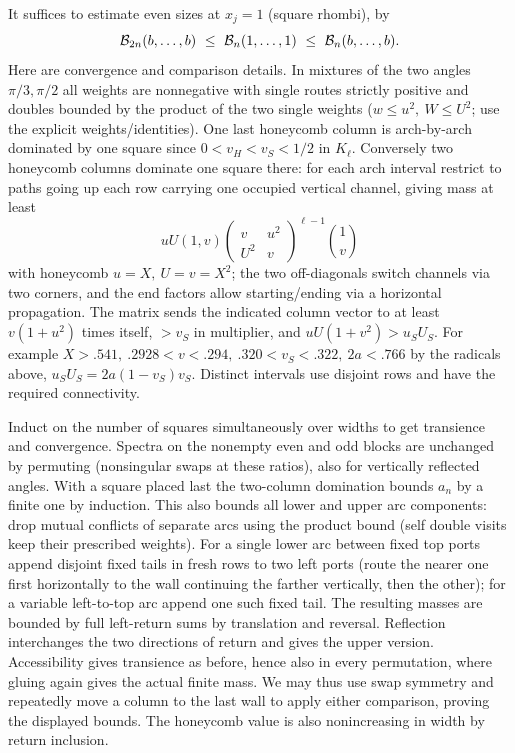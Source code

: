 It suffices to estimate even sizes at \(x_j=1\) (square rhombi), by
\[
 {\cal B}_{2n}(b,\ldots,b)\ \le\ {\cal B}_n(1,\ldots,1)\ \le\ {\cal B}_n(b,\ldots,b).
\]
Here are convergence and comparison details. In mixtures of the two angles \(\pi/3,\pi/2\) all weights are nonnegative with single routes strictly positive and doubles bounded by the product of the two single weights (\(w\le u^2,\ W\le U^2\); use the explicit weights/identities). One last honeycomb column is arch-by-arch dominated by one square since \(0<v_H<v_S<1/2\) in \(K_\ell\). Conversely two honeycomb columns dominate one square there: for each arch interval restrict to paths going up each row carrying one occupied vertical channel, giving mass at least
\[
 uU(1,v)
 \begin{pmatrix}v&u^2\\ U^2&v\end{pmatrix}^{\ell-1}
 \binom{1}{v}
\]
with honeycomb \(u=X,\ U=v=X^2\); the two off-diagonals switch channels via two corners, and the end factors allow starting/ending via a horizontal propagation. The matrix sends the indicated column vector to at least \(v(1+u^2)\) times itself, \(>v_S\) in multiplier, and \(uU(1+v^2)>u_S U_S\). For example \(X>.541,\ .2928<v<.294,\ .320<v_S<.322,\ 2a<.766\) by the radicals above, \(u_SU_S=2a(1-v_S)v_S\). Distinct intervals use disjoint rows and have the required connectivity.

Induct on the number of squares simultaneously over widths to get transience and convergence. Spectra on the nonempty even and odd blocks are unchanged by permuting (nonsingular swaps at these ratios), also for vertically reflected angles. With a square placed last the two-column domination bounds \(a_n\) by a finite one by induction. This also bounds all lower and upper arc components: drop mutual conflicts of separate arcs using the product bound (self double visits keep their prescribed weights). For a single lower arc between fixed top ports append disjoint fixed tails in fresh rows to two left ports (route the nearer one first horizontally to the wall continuing the farther vertically, then the other); for a variable left-to-top arc append one such fixed tail. The resulting masses are bounded by full left-return sums by translation and reversal. Reflection interchanges the two directions of return and gives the upper version. Accessibility gives transience as before, hence also in every permutation, where gluing again gives the actual finite mass. We may thus use swap symmetry and repeatedly move a column to the last wall to apply either comparison, proving the displayed bounds. The honeycomb value is also nonincreasing in width by return inclusion.


